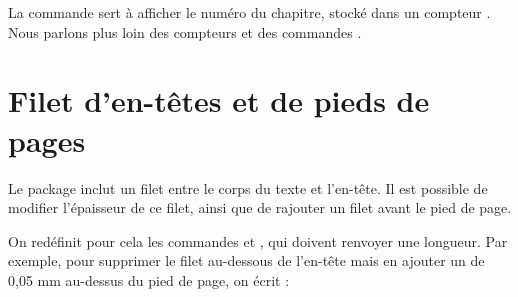 \begin{plusloins}
La commande  sert à afficher le numéro du chapitre, stocké dans un compteur . Nous parlons plus loin des compteurs et des commandes .
\end{plusloins}

\section{Filet d'en-têtes et de pieds de pages}

Le package  inclut un filet entre le corps du texte et l'en-tête. Il est possible de modifier l'épaisseur de ce filet, ainsi que de rajouter un filet avant le  pied de page.

On redéfinit pour cela les commandes  et , qui doivent renvoyer une longueur.
Par exemple, pour supprimer le filet au-dessous de l'en-tête mais en ajouter un de 0,05 mm au-dessus du pied de page, on écrit : 

\begin{latexcode}
\renewcommand{\headrulewidth}[0]{0pt}
\renewcommand{\footrulewidth}[0]{0.05mm}
\end{latexcode}
